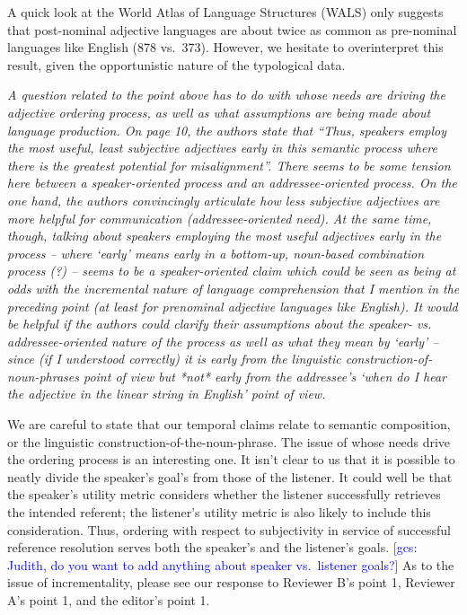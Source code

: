 \documentclass[12pt]{article}
\newcommand{\gcs}[1]{\textcolor{blue}{[gcs: #1]}}
\begin{document}
A quick look at the World Atlas of Language Structures (WALS) only suggests that post-nominal adjective languages are about twice as common as pre-nominal languages like English (878 vs.~373). However, we hesitate to overinterpret this result, given the opportunistic nature of the typological data.

\item \emph{A question related to the point above has to do with whose needs are driving the adjective ordering process, as well as what assumptions are being made
about language production. On page 10, the authors state that ``Thus,
speakers employ the most useful, least subjective adjectives early in this
semantic process where there is the greatest potential for misalignment''.
There seems to be some tension here between a speaker-oriented process and
an addressee-oriented process. On the one hand, the authors convincingly
articulate how less subjective adjectives are more helpful for communication
(addressee-oriented need). At the same time, though, talking about speakers
employing the most useful adjectives early in the process – where
`early' means early in a bottom-up, noun-based combination process (?)
– seems to be a speaker-oriented claim which could be seen as being at
odds with the incremental nature of language comprehension that I mention in
the preceding point (at least for prenominal adjective languages like
English).   It would be helpful if the authors could clarify their
assumptions about the speaker- vs. addressee-oriented nature of the process
as well as what they mean by `early'  – since (if I understood
correctly) it is early from the linguistic construction-of-noun-phrases
point of view but *not* early from the addressee's `when do I hear the
adjective in the linear string in English' point of view.}

We are careful to state that our temporal claims relate to semantic composition, or the linguistic construction-of-the-noun-phrase. The issue of whose needs drive the ordering process is an interesting one. It isn't clear to us that it is possible to neatly divide the speaker's goal's from those of the listener. It could well be that the speaker's utility metric considers whether the listener successfully retrieves the intended referent; the listener's utility metric is also likely to include this consideration. Thus, ordering with respect to subjectivity in service of successful reference resolution serves both the speaker's and the listener's goals. \gcs{Judith, do you want to add anything about speaker vs.~listener goals?} As to the issue of incrementality, please see our response to Reviewer B's point 1, Reviewer A's point 1, and the editor's point 1. 
\end{document}
